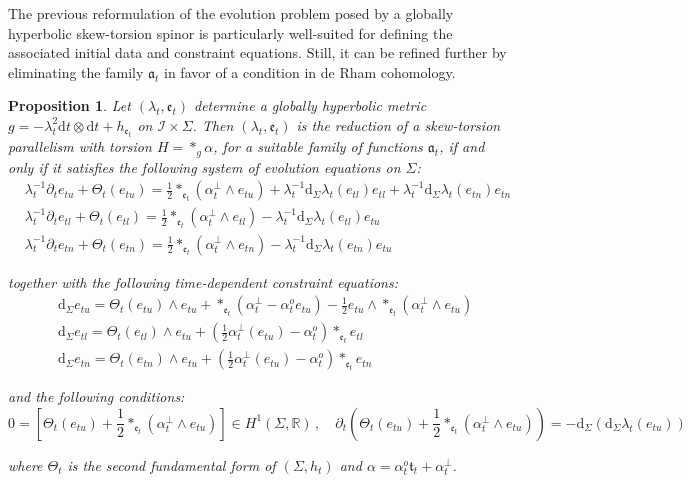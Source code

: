 \documentclass[10pt,reqno,a4paper]{amsart}
\theoremstyle{plain}
\newtheorem{prop}[thm]{Proposition}
\theoremstyle{definition}
\theoremstyle{remark}
\theoremstyle{remark}
\newcommand{\frt}{\mathfrak{t}}
\def\dd{\mathrm{d}}
\def\cI{\mathcal{I}}
\def\fra{\mathfrak{a}}
\def\fre{\mathfrak{e}}
\renewcommand{\(}{ (}
\renewcommand{\)}{ )}
\begin{document}
\noindent
The previous reformulation of the evolution problem posed by a globally hyperbolic skew-torsion spinor is particularly well-suited for defining the associated initial data and constraint equations. Still, it can be refined further by eliminating the family $\fra_t$ in favor of a condition in de Rham cohomology.

\begin{prop}
\label{prop:Thetaevolutionsystem}
Let $(\lambda_t,\fre_t)$ determine a globally hyperbolic metric $g=-\lambda_t^2\dd t\otimes\dd t+h_{\fre_t}$ on $\cI\times\Sigma$. Then $(\lambda_t,\fre_t)$ is the reduction of a skew-torsion parallelism with torsion $H = \ast_g\alpha$, for a suitable family of functions $\fra_t$, if and only if it satisfies the following system of evolution equations on $\Sigma$:
\begin{eqnarray}
	&  \lambda_t^{-1} \partial_t e_{tu} + \Theta_t(e_{tu}) = \frac{1}{2}\ast_{\fre_t} (\alpha^{\perp}_t \wedge e_{tu}) +   \lambda_t^{-1} \dd_{\Sigma} \lambda_t (e_{tl}) e_{tl} + \lambda_t^{-1} \dd_{\Sigma} \lambda_t (e_{tn}) e_{tn} \nonumber \\
	& \lambda_t^{-1} \partial_t e_{tl} + \Theta_t(e_{tl})  = \frac{1}{2} \ast_{\fre_t} (\alpha^{\perp}_t \wedge e_{tl}) -  \lambda_t^{-1} \dd_{\Sigma} \lambda_t (e_{tl}) e_{tu}   \label{eq:evolutionequationsIII} \\
	& \lambda_t^{-1} \partial_t e_{tn} + \Theta_t(e_{tn}) = \frac{1}{2} \ast_{\fre_t} (\alpha^{\perp}_t\wedge e_{tn})  -  \lambda_t^{-1} \dd_{\Sigma} \lambda_t (e_{tn}) e_{tu}   \nonumber
\end{eqnarray}

\noindent
together with the following time-dependent constraint equations:
\begin{eqnarray}
& \dd_{\Sigma} e_{tu} = \Theta_t(e_{tu})\wedge e_{tu} + \ast_{\fre_t} (\alpha^{\perp}_t   - \alpha^o_t e_{tu}) - \frac{1}{2} e_{tu} \wedge \ast_{\fre_t} (\alpha^{\perp}_t \wedge e_{tu}) \nonumber \\
& \dd_{\Sigma} e_{tl} = \Theta_t(e_{tl})\wedge e_{tu} +  (\frac{1}{2} \alpha^{\perp}_t (e_{tu}) - \alpha^o_t) \ast_{\fre_t} e_{tl} \label{eq:constraintequationsIII} \\
& \dd_{\Sigma} e_{tn} = \Theta_t(e_{tn})\wedge e_{tu} +  (\frac{1}{2} \alpha^{\perp}_t (e_{tu}) - \alpha^o_t) \ast_{\fre_t} e_{tn} \nonumber 
\end{eqnarray}

\noindent
and the following conditions:
\begin{equation}
\label{eq:cohomologicalccondition}
0 = [\Theta_t (e_{tu}) + \frac{1}{2}\ast_{\fre_t} (\alpha^{\perp}_t \wedge e_{tu})]\in H^1(\Sigma,\mathbb{R})\, , \quad \partial_t (\Theta_t (e_{tu}) + \frac{1}{2}\ast_{\fre_t} (\alpha^{\perp}_t \wedge e_{tu})) = -\dd_{\Sigma}(\dd_{\Sigma}\lambda_t (e_{tu}))
\end{equation}

\noindent
where $\Theta_t$ is the second fundamental form of $(\Sigma,h_t)$ and $\alpha = \alpha^o_t \frt_t + \alpha^{\perp}_t$. 
\end{prop}
 
\end{document}
